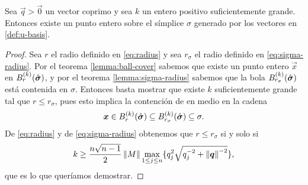 \begin{theorem}
	\label{th:intsimplex}
	Sea $\vec{q} > \vec{0}$ un vector coprimo y sea $k$ un entero positivo suficientemente grande.
	Entonces existe un punto entero sobre el símplice $\sigma$ generado por los vectores en
	\eqref{def:u-basis}.
\end{theorem}
\begin{proof}
	Sea $r$ el radio definido en \eqref{eq:radius} y sea $r_\sigma$ el radio definido en
	\eqref{eq:sigma-radius}. Por el teorema \ref{lemma:ball-cover} sabemos que existe un punto
	entero $\vec{x}$ en $B_r^{(k)}(\hat{\boldsymbol{ \sigma }})$, y por el teorema \ref{lemma:sigma-radius} sabemos
	que la bola $B_{r_\sigma}^{(k)}(\hat{\boldsymbol{ \sigma }})$ está contenida en $\sigma$. Entonces basta
	mostrar que existe $k$ suficientemente grande tal que $r \leq r_\sigma$, pues esto implica la
	contención de en medio en la cadena
	\begin{equation*}
		\boldsymbol{x} \in B_r^{(k)}(\hat{\boldsymbol{ \sigma }}) \subseteq B_{r_\sigma}^{(k)}(\hat{\boldsymbol{ \sigma }}) \subseteq \sigma.
	\end{equation*}
	De \eqref{eq:radius} y de \eqref{eq:sigma-radius} obtenemos que $r \leq r_\sigma$ si y solo si
	\begin{equation}
		\label{eq:eta-limit}
		k \geq \frac{n\sqrt{n - 1}}{2}\left\lVert M \right\rVert \max_{1 \leq j \leq n} \lbrace q_j^2 \sqrt{q_j^{-2} + \left\lVert \boldsymbol{q} \right\rVert^{-2}} \rbrace,
	\end{equation}
	que es lo que queríamos demostrar.
\end{proof}


